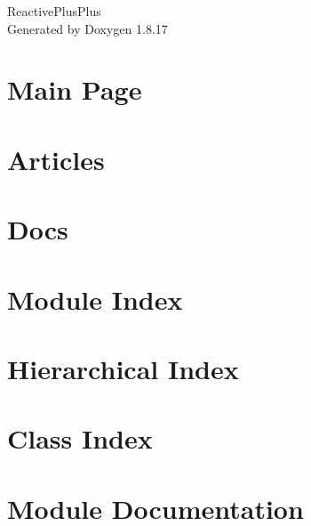 \let\mypdfximage\pdfximage\def\pdfximage{\immediate\mypdfximage}\documentclass[twoside]{book}
\newcommand{\+}{\discretionary{\mbox{\scriptsize$\hookleftarrow$}}{}{}}
\newcommand{\clearemptydoublepage}{%
  \newpage{\pagestyle{empty}\cleardoublepage}%
}
\begin{document}
\hypersetup{pageanchor=false,
             bookmarksnumbered=true,
             pdfencoding=unicode
            }
\begin{titlepage}
\vspace*{7cm}
\begin{center}%
{\Large Reactive\+Plus\+Plus }\\
\vspace*{1cm}
{\large Generated by Doxygen 1.8.17}\\
\end{center}
\end{titlepage}
\clearemptydoublepage
{}
\tableofcontents
\clearemptydoublepage
{}
\hypersetup{pageanchor=true}

\chapter{Main Page}
\label{index}\hypertarget{index}{}
\chapter{Articles}
\label{md_docs__articles}

\chapter{Docs}
\label{docs}

\chapter{Module Index}

\chapter{Hierarchical Index}

\chapter{Class Index}

\chapter{Module Documentation}














\end{document}
